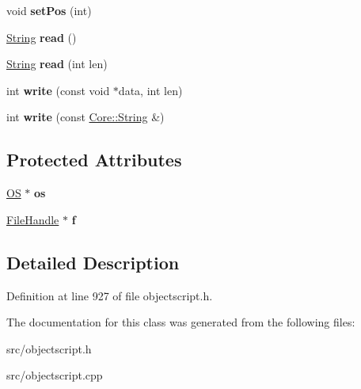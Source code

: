 \begin{DoxyCompactItemize}
\item 
void {\bfseries set\+Pos} (int)\hypertarget{class_object_script_1_1_o_s_1_1_core_1_1_file_ac69a6e392dedc910aacbecf1eea90b34}{}\label{class_object_script_1_1_o_s_1_1_core_1_1_file_ac69a6e392dedc910aacbecf1eea90b34}

\item 
\hyperlink{class_object_script_1_1_o_s_1_1_core_1_1_string}{String} {\bfseries read} ()\hypertarget{class_object_script_1_1_o_s_1_1_core_1_1_file_a6f9c2f0faa4ad9f674827010b74a6037}{}\label{class_object_script_1_1_o_s_1_1_core_1_1_file_a6f9c2f0faa4ad9f674827010b74a6037}

\item 
\hyperlink{class_object_script_1_1_o_s_1_1_core_1_1_string}{String} {\bfseries read} (int len)\hypertarget{class_object_script_1_1_o_s_1_1_core_1_1_file_a9ba15a1698ff09a98ab93863dcb9fb26}{}\label{class_object_script_1_1_o_s_1_1_core_1_1_file_a9ba15a1698ff09a98ab93863dcb9fb26}

\item 
int {\bfseries write} (const void $\ast$data, int len)\hypertarget{class_object_script_1_1_o_s_1_1_core_1_1_file_a484e1b948225dfaa175633b258fdeca2}{}\label{class_object_script_1_1_o_s_1_1_core_1_1_file_a484e1b948225dfaa175633b258fdeca2}

\item 
int {\bfseries write} (const \hyperlink{class_object_script_1_1_o_s_1_1_core_1_1_string}{Core\+::\+String} \&)\hypertarget{class_object_script_1_1_o_s_1_1_core_1_1_file_a93f1e350ce9ab14deaaa397499678b7a}{}\label{class_object_script_1_1_o_s_1_1_core_1_1_file_a93f1e350ce9ab14deaaa397499678b7a}

\end{DoxyCompactItemize}
\subsection*{Protected Attributes}
\begin{DoxyCompactItemize}
\item 
\hyperlink{class_object_script_1_1_o_s}{OS} $\ast$ {\bfseries os}\hypertarget{class_object_script_1_1_o_s_1_1_core_1_1_file_a9e6478b9da383d6946b1eb96c496108b}{}\label{class_object_script_1_1_o_s_1_1_core_1_1_file_a9e6478b9da383d6946b1eb96c496108b}

\item 
\hyperlink{struct_object_script_1_1_o_s_1_1_file_handle}{File\+Handle} $\ast$ {\bfseries f}\hypertarget{class_object_script_1_1_o_s_1_1_core_1_1_file_ab28b3780239b82d6a28268619ffd8621}{}\label{class_object_script_1_1_o_s_1_1_core_1_1_file_ab28b3780239b82d6a28268619ffd8621}

\end{DoxyCompactItemize}


\subsection{Detailed Description}


Definition at line 927 of file objectscript.\+h.



The documentation for this class was generated from the following files\+:\begin{DoxyCompactItemize}
\item 
src/objectscript.\+h\item 
src/objectscript.\+cpp\end{DoxyCompactItemize}
